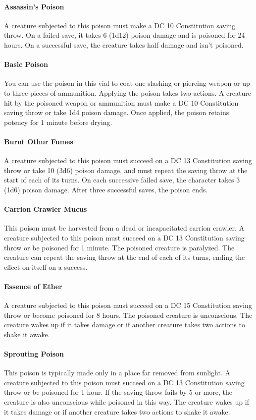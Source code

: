     \paragraph{Assassin's Poison}
        A creature subjected to this poison must make a DC 10 Constitution saving throw.
        On a failed save, it takes 6 (1d12) poison damage and is poisoned for 24 hours.
        On a successful save, the creature takes half damage and isn't poisoned.
    \paragraph{Basic Poison}
        You can use the poison in this vial to coat one slashing or piercing weapon or up to three pieces of ammunition.
        Applying the poison takes two actions.
        A creature hit by the poisoned weapon or ammunition must make a DC 10 Constitution saving throw or take 1d4 poison damage.
        Once applied, the poison retains potency for 1 minute before drying.
    \paragraph{Burnt Othur Fumes}
        A creature subjected to this poison must succeed on a DC 13 Constitution saving throw or take 10 (3d6) poison damage, and must repeat the saving throw at the start of each of its turns.
        On each successive failed save, the character takes 3 (1d6) poison damage.
        After three successful saves, the poison ends.
    \paragraph{Carrion Crawler Mucus}
        This poison must be harvested from a dead or incapacitated carrion crawler.
        A creature subjected to this poison must succeed on a DC 13 Constitution saving throw or be poisoned for 1 minute.
        The poisoned creature is paralyzed.
        The creature can repeat the saving throw at the end of each of its turns, ending the effect on itself on a success.
    \paragraph{Essence of Ether}
        A creature subjected to this poison must succeed on a DC 15 Constitution saving throw or become poisoned for 8 hours.
        The poisoned creature is unconscious.
        The creature wakes up if it takes damage or if another creature takes two actions to shake it awake.
    \paragraph{Sprouting Poison}
        This poison is typically made only in a place far removed from sunlight.
        A creature subjected to this poison must succeed on a DC 13 Constitution saving throw or be poisoned for 1 hour.
        If the saving throw fails by 5 or more, the creature is also unconscious while poisoned in this way.
        The creature wakes up if it takes damage or if another creature takes two actions to shake it awake.
